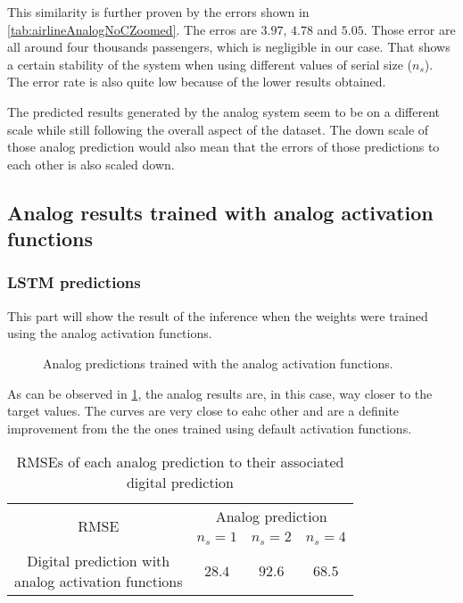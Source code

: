 This similarity is further proven by the errors shown in \cref{tab:airlineAnalogNoCZoomed}. The erros are $3.97$, $4.78$ and $5.05$. Those error are all around four thousands passengers, which is negligible in our case. That shows a certain stability of the system when using different values of serial size ($n_s$). The error rate is also quite low because of the lower results obtained.

The predicted results generated by the analog system seem to be on a different scale while still following the overall aspect of the dataset. The down scale of those analog prediction would also mean that the errors of those predictions to each other is also scaled down.

\subsection{Analog results trained with analog activation functions}

\subsubsection{\ac{LSTM} predictions}

This part will show the result of the inference when the weights were trained using the analog activation functions.

\begin{figure}[H]
  \centering
  
  \caption{Analog predictions trained with the analog activation functions.}
  \label{graph:airlineAnalog}
\end{figure}

As can be observed in \cref{graph:airlineAnalog}, the analog results are, in this case, way closer to the target values. The curves are very close to eahc other and are a definite improvement from the the ones trained using default activation functions.

\begin{table}[H]
  \centering
  \begin{tabular}{|c|c|c|c|}
    \hline
    \multirow{2}{*}{\acs{RMSE}} & \multicolumn{3}{|c|}{Analog prediction}\\
    \cline{2-4}
    & $n_s=1$ & $n_s=2$ & $n_s=4$ \\
    \hline
    \specialcell{Digital prediction with\\analog activation functions} & $28.4$ & $92.6$ & $68.5$\\
    \hline
  \end{tabular}
  \caption{\acp{RMSE} of each analog prediction to their associated digital prediction}
  \label{tab:airlineAnalog}
\end{table}

